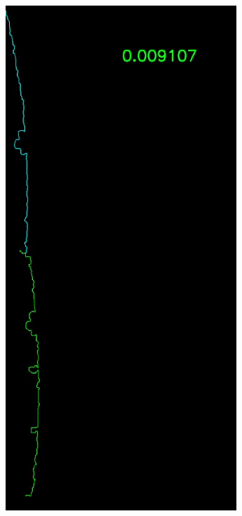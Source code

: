 \documentclass[../main.tex]{subfiles}
\begin{document}
\begin{figure}[h]
    \centering
    \begin{minipage}{0.24\textwidth}
        \centering
        \includegraphics[width=\textwidth]{images/stitching_beginn.PNG} %

\end{minipage}
\end{figure}
\end{document}
